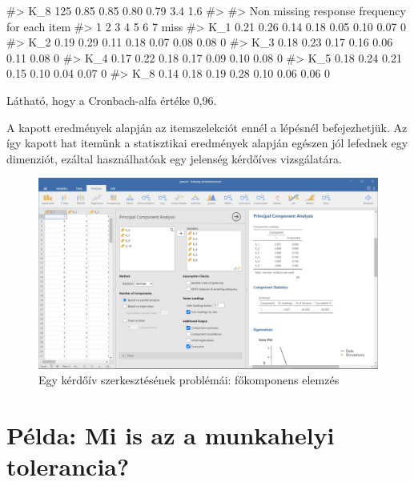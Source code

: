 \documentclass[
  letterpaper,
]{krantz}
\makeatletter
\newenvironment{Shaded}{\begin{snugshade}}{\end{snugshade}}
\newcommand{\CommentTok}[1]{\textcolor[rgb]{0.37,0.37,0.37}{#1}}
\newenvironment{kframe}{%
\medskip{}
\setlength{\fboxsep}{.8em}
 \def\at@end@of@kframe{}%
 \ifinner\ifhmode%
  \def\at@end@of@kframe{\end{minipage}}%
  \begin{minipage}{\columnwidth}%
 \fi\fi%
 \def\FrameCommand##1{\hskip\@totalleftmargin \hskip-\fboxsep
 \colorbox{shadecolor}{##1}\hskip-\fboxsep
     \hskip-\linewidth \hskip-\@totalleftmargin \hskip\columnwidth}%
 \MakeFramed {\advance\hsize-\width
   \@totalleftmargin\z@ \linewidth\hsize
   \@setminipage}}%
 {\par\unskip\endMakeFramed%
 \at@end@of@kframe}
\renewenvironment{Shaded}{\begin{kframe}}{\end{kframe}}
\makeatother
\begin{document}
\begin{Shaded}
\begin{Highlighting}[]
\CommentTok{\#\textgreater{} K\_8 125  0.85  0.85  0.80   0.79  3.4 1.6}
\CommentTok{\#\textgreater{} }
\CommentTok{\#\textgreater{} Non missing response frequency for each item}
\CommentTok{\#\textgreater{}        1    2    3    4    5    6    7 miss}
\CommentTok{\#\textgreater{} K\_1 0.21 0.26 0.14 0.18 0.05 0.10 0.07    0}
\CommentTok{\#\textgreater{} K\_2 0.19 0.29 0.11 0.18 0.07 0.08 0.08    0}
\CommentTok{\#\textgreater{} K\_3 0.18 0.23 0.17 0.16 0.06 0.11 0.08    0}
\CommentTok{\#\textgreater{} K\_4 0.17 0.22 0.18 0.17 0.09 0.10 0.08    0}
\CommentTok{\#\textgreater{} K\_5 0.18 0.24 0.21 0.15 0.10 0.04 0.07    0}
\CommentTok{\#\textgreater{} K\_8 0.14 0.18 0.19 0.28 0.10 0.06 0.06    0}
\end{Highlighting}
\end{Shaded}

Látható, hogy a Cronbach-alfa értéke 0,96.

A kapott eredmények alapján az itemszelekciót ennél a lépésnél
befejezhetjük. Az így kapott hat itemünk a statisztikai eredmények
alapján egészen jól lefednek egy dimenziót, ezáltal használhatóak egy
jelenség kérdőíves vizsgálatára.

\begin{figure}

{\centering \includegraphics{./images/fokomp_kerdoivtervezet_kep_01.jpg}

}

\caption{Egy kérdőív szerkesztésének problémái: főkomponens elemzés}

\end{figure}

\hypertarget{puxe9lda-mi-is-az-a-munkahelyi-tolerancia}{%
\section{Példa: Mi is az a munkahelyi
tolerancia?}\label{puxe9lda-mi-is-az-a-munkahelyi-tolerancia}}
\end{document}
